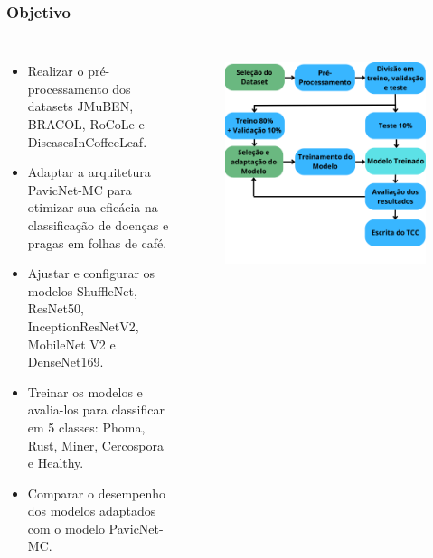 \documentclass[aspectratio=169]{beamer}
\begin{document}
\begin{frame}
    \frametitle{Objetivo}
    \begin{columns}


        \begin{itemize}
            \item Realizar o pré-processamento dos datasets JMuBEN, BRACOL, RoCoLe e DiseasesInCoffeeLeaf.
            \item Adaptar a arquitetura PavicNet-MC para otimizar sua eficácia na classificação de doenças e pragas em folhas de café.
            \item Ajustar e configurar os modelos ShuffleNet, ResNet50, InceptionResNetV2, MobileNet V2 e DenseNet169.
            \item Treinar os modelos e avalia-los para classificar em 5 classes: Phoma, Rust, Miner, Cercospora e Healthy.
            \item Comparar o desempenho dos modelos adaptados com o modelo PavicNet-MC.
        \end{itemize}


        \vspace{-20px}
        \begin{figure}
            \centering
            \includegraphics[scale = 0.2]{img/diagrama (2).png}
            \label{fig:enter-label}
        \end{figure}

    \end{columns}
\end{frame}
\end{document}
